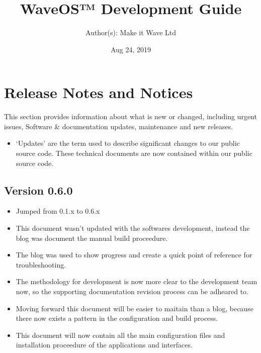 \documentclass[letterpaper,10pt,openany,oneside,english]{sphinxmanual}
\title{WaveOS™ Development Guide}
\date{Aug 24, 2019}
\author{Author(s): Make it Wave Ltd}
\begin{document}
\maketitle
\sphinxtableofcontents
{}\label{\detokenize{index::doc}}




\chapter{Release Notes and Notices}
\label{\detokenize{releasenotes:release-notes-and-notices}}\label{\detokenize{releasenotes::doc}}
This section provides information about what is new or changed, including urgent issues, Software \& documentation updates, maintenance and new releases.
\begin{itemize}
\item {} 
‘Updates’ are the term used to describe significant changes to our public source code. These technical documents are now contained within our public source code.

\end{itemize}


\section{Version 0.6.0}
\label{\detokenize{releasenotes:version-0-6-0}}\begin{itemize}
\item {} 
Jumped from 0.1.x to 0.6.x

\item {} 
This document wasn’t updated with the softwares development, instead the blog was document the manual build proceedure.

\item {} 
The blog was used to show progress and create a quick point of reference for troubleshooting.

\item {} 
The methodology for development is now more clear to the development team now, so the supporting documentation revision process can be adheared to.

\item {} 
Moving forward this document will be easier to maitain than a blog, because there now exists a pattern in the configuration and build process.

\item {} 
This document will now contain all the main configuration files and installation proceedure of the applications and interfaces.

\end{itemize}
\end{document}
